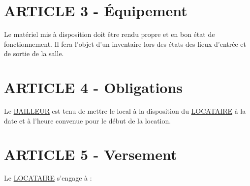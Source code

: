 \documentclass{article}
\begin{document}
\section*{ARTICLE 3 - Équipement}
Le matériel mis à disposition doit être rendu propre et en bon état de fonctionnement. Il fera l’objet d’un inventaire lors des états des lieux d’entrée et de sortie de la salle.

\section*{ARTICLE 4 - Obligations}
Le \underline{BAILLEUR} est tenu de mettre le local à la disposition du \underline{LOCATAIRE} à la date et à l’heure convenue pour le début de la location.


\section*{ARTICLE 5 - Versement}
Le \underline{LOCATAIRE} s’engage à :
\end{document}
